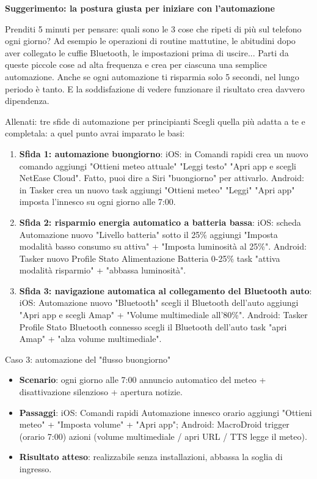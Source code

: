 \textbf{Suggerimento: la postura giusta per iniziare con l'automazione}\par

Prenditi 5 minuti per pensare: quali sono le 3 cose che ripeti di più sul telefono ogni giorno? Ad esempio le operazioni di routine mattutine, le abitudini dopo aver collegato le cuffie Bluetooth, le impostazioni prima di uscire... Parti da queste piccole cose ad alta frequenza e crea per ciascuna una semplice automazione. Anche se ogni automazione ti risparmia solo 5 secondi, nel lungo periodo è tanto. E la soddisfazione di vedere funzionare il risultato crea davvero dipendenza.

\begin{tcbpractice}{Allenati: tre sfide di automazione per principianti}
Scegli quella più adatta a te e completala: a quel punto avrai imparato le basi:

\begin{enumerate}
  \item \textbf{Sfida 1: automazione buongiorno}: iOS: in Comandi rapidi crea un nuovo comando aggiungi "Ottieni meteo attuale" "Leggi testo" "Apri app e scegli NetEase Cloud". Fatto, puoi dire a Siri "buongiorno" per attivarlo. Android: in Tasker crea un nuovo task aggiungi "Ottieni meteo" "Leggi" "Apri app" imposta l'innesco su ogni giorno alle 7:00.
  \item \textbf{Sfida 2: risparmio energia automatico a batteria bassa}: iOS: scheda Automazione nuovo "Livello batteria" sotto il 25\% aggiungi "Imposta modalità basso consumo su attiva" + "Imposta luminosità al 25\%". Android: Tasker nuovo Profile Stato Alimentazione Batteria 0-25\% task "attiva modalità risparmio" + "abbassa luminosità".
  \item \textbf{Sfida 3: navigazione automatica al collegamento del Bluetooth auto}: iOS: Automazione nuovo "Bluetooth" scegli il Bluetooth dell'auto aggiungi "Apri app e scegli Amap" + "Volume multimediale all'80\%". Android: Tasker Profile Stato Bluetooth connesso scegli il Bluetooth dell'auto task "apri Amap" + "alza volume multimediale".
\end{enumerate}

\end{tcbpractice}

\begin{tcbinfo}{Caso 3: automazione del "flusso buongiorno"}
\begin{itemize}
  \item \textbf{Scenario}: ogni giorno alle 7:00 annuncio automatico del meteo + disattivazione silenzioso + apertura notizie.
  \item \textbf{Passaggi}: iOS: Comandi rapidi Automazione innesco orario aggiungi "Ottieni meteo" + "Imposta volume" + "Apri app"; Android: MacroDroid trigger (orario 7:00) azioni (volume multimediale / apri URL / TTS legge il meteo).
  \item \textbf{Risultato atteso}: realizzabile senza installazioni, abbassa la soglia di ingresso.
\end{itemize}

\end{tcbinfo}
